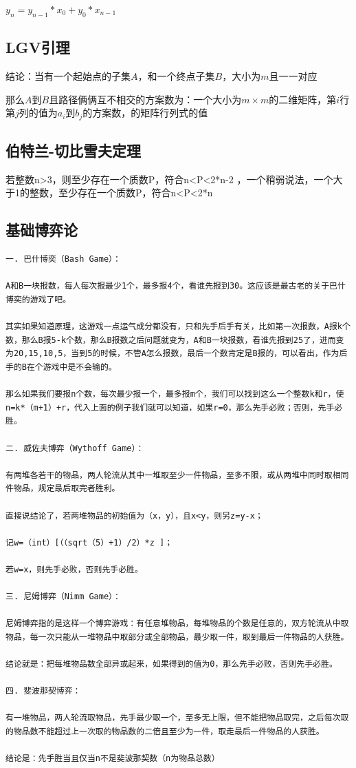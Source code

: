 \documentclass[12pt, a4paper, oneside]{ctexart}
\begin{document}
${y_n=y_{n-1}*x_0+y_0*x_{n-1}}$

\subsection{LGV引理}
结论：当有一个起始点的子集${A}$，和一个终点子集${B}$，大小为${m}$且一一对应

那么${A}$到${B}$且路径俩俩互不相交的方案数为：一个大小为${m\times m}$的二维矩阵，第${i}$行第${j}$列的值为${a_i}$到${b_j}$的方案数，的矩阵行列式的值

\subsection{伯特兰-切比雪夫定理} 
若整数n>3，则至少存在一个质数P，符合n<P<2*n-2 ，一个稍弱说法，一个大于1的整数，至少存在一个质数P，符合n<P<2*n

\newpage 
\subsection{基础博弈论} 
\begin{lstlisting}
一. 巴什博奕（Bash Game）：

A和B一块报数，每人每次报最少1个，最多报4个，看谁先报到30。这应该是最古老的关于巴什博奕的游戏了吧。

其实如果知道原理，这游戏一点运气成分都没有，只和先手后手有关，比如第一次报数，A报k个数，那么B报5-k个数，那么B报数之后问题就变为，A和B一块报数，看谁先报到25了，进而变为20,15,10,5，当到5的时候，不管A怎么报数，最后一个数肯定是B报的，可以看出，作为后手的B在个游戏中是不会输的。

那么如果我们要报n个数，每次最少报一个，最多报m个，我们可以找到这么一个整数k和r，使n=k*（m+1）+r，代入上面的例子我们就可以知道，如果r=0，那么先手必败；否则，先手必胜。

二. 威佐夫博弈（Wythoff Game）：

有两堆各若干的物品，两人轮流从其中一堆取至少一件物品，至多不限，或从两堆中同时取相同件物品，规定最后取完者胜利。

直接说结论了，若两堆物品的初始值为（x，y），且x<y，则另z=y-x；

记w=（int）[（（sqrt（5）+1）/2）*z ]；

若w=x，则先手必败，否则先手必胜。

三. 尼姆博弈（Nimm Game）：

尼姆博弈指的是这样一个博弈游戏：有任意堆物品，每堆物品的个数是任意的，双方轮流从中取物品，每一次只能从一堆物品中取部分或全部物品，最少取一件，取到最后一件物品的人获胜。

结论就是：把每堆物品数全部异或起来，如果得到的值为0，那么先手必败，否则先手必胜。

四. 斐波那契博弈：

有一堆物品，两人轮流取物品，先手最少取一个，至多无上限，但不能把物品取完，之后每次取的物品数不能超过上一次取的物品数的二倍且至少为一件，取走最后一件物品的人获胜。

结论是：先手胜当且仅当n不是斐波那契数（n为物品总数）
\end{lstlisting}
\end{document}

